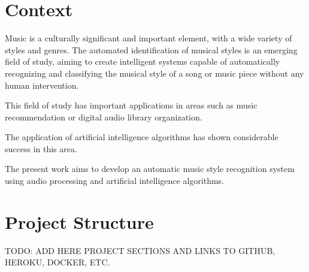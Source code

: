 
\section{Context}

Music is a culturally significant and important element, with a wide variety of styles and genres.
The automated identification of musical styles is an emerging field of study, aiming to create intelligent systems capable of automatically recognizing and classifying the musical style of a song or music piece without any human intervention.

This field of study has important applications in areas such as music recommendation or digital audio library organization.

The application of artificial intelligence algorithms has shown considerable success in this area.

The present work aims to develop an automatic music style recognition system using audio processing and artificial intelligence algorithms.

\section{Project Structure}
TODO: ADD HERE PROJECT SECTIONS AND LINKS TO GITHUB, HEROKU, DOCKER, ETC.
